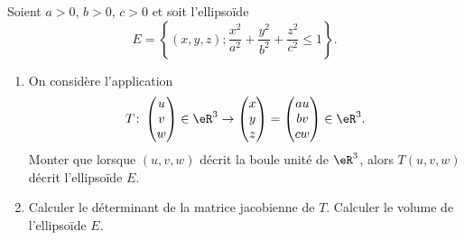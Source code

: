
\begin{exercice}\label{exoOutilsMath-0122}

    Soient \( a>0\), \( b>0\), \( c>0\) et soit l'ellipsoïde 
    \begin{equation}
        E=\left\{ (x,y,z);\frac{ x^2 }{ a^2 }+\frac{ y^2 }{ b^2 }+\frac{ z^2 }{ c^2 }\leq 1 \right\}.
    \end{equation}
    \begin{enumerate}
        \item
            On considère l'application
            \begin{equation}
                T\colon \begin{pmatrix}
                    u    \\ 
                    v    \\ 
                    w    
                \end{pmatrix}\in\eR^3\to \begin{pmatrix}
                    x    \\ 
                    y    \\ 
                    z    
                \end{pmatrix}=\begin{pmatrix}
                    au    \\ 
                    bv    \\ 
                    cw    
                \end{pmatrix}\in\eR^3.
            \end{equation}
            Monter que lorsque \( (u,v,w)\) décrit la boule unité de \( \eR^3\), alors \( T(u,v,w)\) décrit l'ellipsoïde \( E\).
        \item
            Calculer le déterminant de la matrice jacobienne de \( T\). Calculer le volume de l'ellipsoïde \( E\).
    \end{enumerate}
    

\end{exercice}
